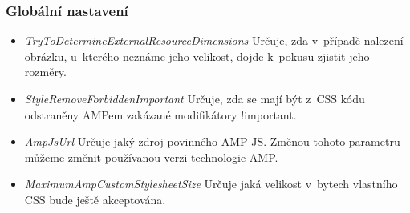 \subsubsection{Globální nastavení}
\begin{itemize}
    \item \textit{TryToDetermineExternalResourceDimensions} \newline
    Určuje, zda v~případě nalezení obrázku, u~kterého neznáme jeho velikost, dojde k~pokusu zjistit jeho rozměry.
    \item \textit{StyleRemoveForbiddenImportant}\newline
    Určuje, zda se mají být z~CSS kódu odstraněny AMPem zakázané modifikátory !important.
    \item \textit{AmpJsUrl}\newline
    Určuje jaký zdroj povinného AMP JS. Změnou tohoto parametru můžeme změnit používanou verzi technologie AMP.
    \item \textit{MaximumAmpCustomStylesheetSize}\newline
    Určuje jaká velikost v~bytech vlastního CSS bude ještě akceptována.
\end{itemize}


